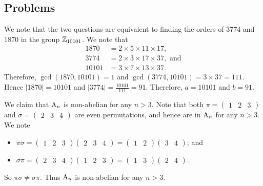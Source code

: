 \subsection*{Problems}
\begin{questions}
    \item We note that the two questions are equivalent to finding the orders of 3774 and 1870 in the group $\mathbb{Z}_{10101}$. We note that
    \begin{align*}
        1870 &= 2 \times 5 \times 11 \times 17,\\
        3774 &= 2 \times 3 \times 17 \times 37, \text{ and}\\
        10101 &= 3 \times 7 \times 13 \times 37.
    \end{align*}
    Therefore, $\gcd(1870, 10101) = 1$ and $\gcd(3774, 10101) = 3 \times 37 = 111$. Hence $|1870| = 10101$ and $|3774| = \frac{10101}{111} = 91$. Therefore, $a = 10101$ and $b = 91$.

    \item We claim that $\mathrm{A}_{n}$ is non-abelian for any $n > 3$. Note that both $\pi = \begin{pmatrix}1 & 2 & 3\end{pmatrix}$ and $\sigma = \begin{pmatrix}2 & 3 & 4\end{pmatrix}$ are even permutations, and hence are in $\mathrm{A}_{n}$ for any $n > 3$. We note
    \begin{itemize}
        \item $\pi\sigma = \begin{pmatrix}1 & 2 & 3\end{pmatrix}\begin{pmatrix}2 & 3 & 4\end{pmatrix} = \begin{pmatrix}1 & 2\end{pmatrix}\begin{pmatrix}3 & 4\end{pmatrix}$; and
        \item $\sigma\pi = \begin{pmatrix}2 & 3 & 4\end{pmatrix}\begin{pmatrix}1 & 2 & 3\end{pmatrix} = \begin{pmatrix}1 & 3\end{pmatrix}\begin{pmatrix}2 & 4\end{pmatrix}$.
    \end{itemize}
    So $\pi\sigma \neq \sigma\pi$. Thus $\mathrm{A}_{n}$ is non-abelian for any $n > 3$.


\end{questions}

